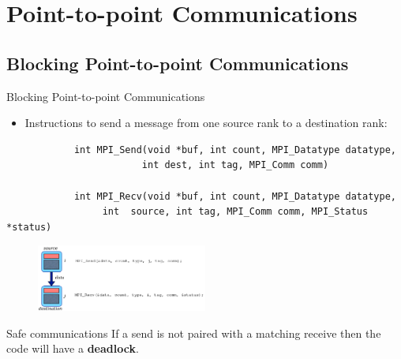 
\section{Point-to-point Communications}

\subsection{Blocking Point-to-point Communications}
\begin{frame}[fragile]{Blocking Point-to-point Communications}
    \begin{itemize}
        \item Instructions to send a message from one source rank to a destination rank: 
    \end{itemize}
\vspace{-2mm}
\scriptsize\begin{verbatim}
            int MPI_Send(void *buf, int count, MPI_Datatype datatype,
                        int dest, int tag, MPI_Comm comm)
            
            int MPI_Recv(void *buf, int count, MPI_Datatype datatype, 
                 int  source, int tag, MPI_Comm comm, MPI_Status *status)
\end{verbatim}
\normalsize
\vspace{-2mm}
\begin{figure}
    \centering
    \includegraphics[width=0.5\textwidth]{img/pointpoint.png}
\end{figure} 
\vspace{-2mm}
\begin{alertblock}{Safe communications}
If a send is not paired with a matching receive then the
code will have a \textbf{deadlock}.
\end{alertblock}


\end{frame}

